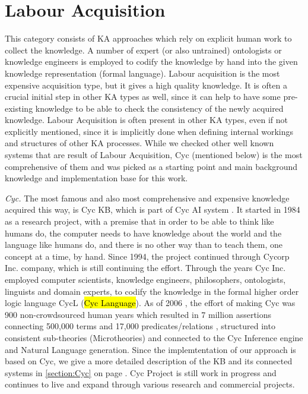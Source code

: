 \section{Labour Acquisition}
\label{section:LabourAcquisition}
This category consists of KA approaches which rely on explicit human work to collect the knowledge. A number of expert (or also untrained) ontologists or knowledge engineers is employed to codify the knowledge by hand into the given knowledge representation (formal language). Labour acquisition is the most expensive acquisition type, but it gives a high quality knowledge. It is often a crucial initial step in other KA types as well, since it can help to have some pre-existing knowledge to be able to check the consistency of the newly acquired knowledge. Labour Acquisition is often present in other KA types, even if not explicitly mentioned, since it is implicitly done when defining internal workings and structures of other KA processes. While we checked other well known systems that are result of Labour Acquisition, Cyc (mentioned below) is the most comprehensive of them and was picked as a starting point and main background knowledge and implementation base for this work.

\emph{Cyc.} The most famous and also most comprehensive and expensive knowledge acquired this way, is Cyc KB, which is part of Cyc AI system \parencite{Lenat1995}. It started in 1984 as a research project, with a premise that in order to be able to think like humans do, the computer needs to have knowledge about the world and the language like humans do, and there is no other way than to teach them, one concept at a time, by hand. Since 1994, the project continued through Cycorp Inc. company, which is still continuing the effort. Through the years Cyc Inc. employed computer scientists, knowledge engineers, philosophers, ontologists, linguists and domain experts, to codify the knowledge in the formal higher order logic language CycL (\hl{Cyc Language}). As of 2006   \parencite{Matuszek2006}, the effort of making Cyc was 900 non-crowdsourced human years which resulted in 7 million assertions connecting 500,000 terms and 17,000 predicates/relations \parencite{Zang2013}, structured into consistent sub-theories (Microtheories) and connected to the Cyc Inference engine and Natural Language generation. Since the implemtentation of our approach is based on Cyc, we give a more detailed description of the KB and its connected systems in \autoref{section:Cyc} on page \pageref{section:Cyc}. Cyc Project is still work in progress and continues to live and expand through various research and commercial projects.

